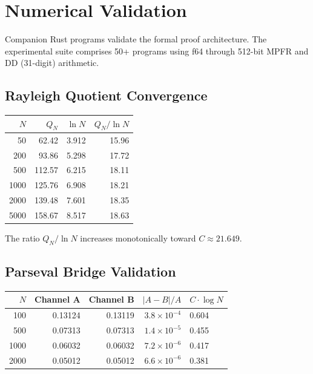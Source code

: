 \documentclass[11pt,a4paper]{article}
\begin{document}
\section{Numerical Validation}
\label{sec:numerical}

Companion Rust programs validate the formal proof architecture.
The experimental suite comprises 50+ programs using f64 through
512-bit MPFR and DD (31-digit) arithmetic.

\subsection{Rayleigh Quotient Convergence}

\begin{center}
\begin{tabular}{@{}rrcr@{}}
\toprule
$N$ & $Q_N$ & $\ln N$ & $Q_N / \ln N$ \\
\midrule
50 & 62.42 & 3.912 & 15.96 \\
200 & 93.86 & 5.298 & 17.72 \\
500 & 112.57 & 6.215 & 18.11 \\
1000 & 125.76 & 6.908 & 18.21 \\
2000 & 139.48 & 7.601 & 18.35 \\
5000 & 158.67 & 8.517 & 18.63 \\
\bottomrule
\end{tabular}
\end{center}

The ratio $Q_N/\ln N$ increases monotonically toward $C \approx 21.649$.

\subsection{Parseval Bridge Validation}

\begin{center}
\begin{tabular}{@{}rrrrl@{}}
\toprule
$N$ & Channel A & Channel B & $|A-B|/A$ & $C \cdot \log N$ \\
\midrule
100 & 0.13124 & 0.13119 & $3.8\times10^{-4}$ & 0.604 \\
500 & 0.07313 & 0.07313 & $1.4\times10^{-5}$ & 0.455 \\
1000 & 0.06032 & 0.06032 & $7.2\times10^{-6}$ & 0.417 \\
2000 & 0.05012 & 0.05012 & $6.6\times10^{-6}$ & 0.381 \\
\bottomrule
\end{tabular}
\end{center}
\end{document}
